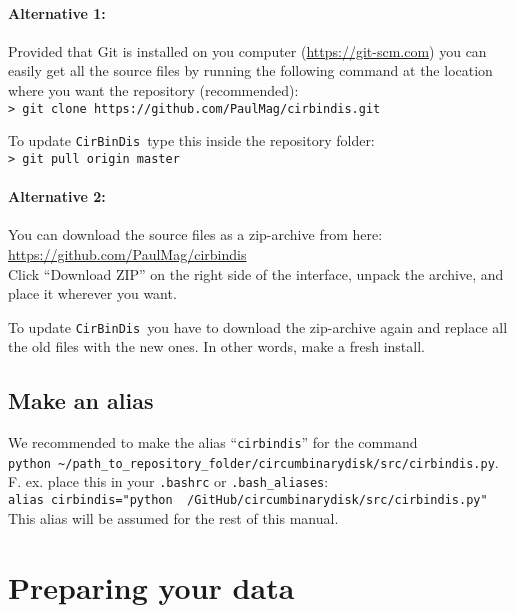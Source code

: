 \documentclass[a4paper, 12pt, english, titlepage]{article}
\newcommand{\sname}{\texttt{CirBinDis }}
\begin{document}
    \paragraph{Alternative 1:}
    Provided that Git is installed on you computer (\url{https://git-scm.com}) you can easily get all the source files by running the following command at the location where you want the repository (recommended): \\
    \texttt{> git clone https://github.com/PaulMag/cirbindis.git}
    
    To update \sname type this inside the repository folder: \\
    \texttt{> git pull origin master}

    \paragraph{Alternative 2:}
    You can download the source files as a zip-archive from here: \\
    \url{https://github.com/PaulMag/cirbindis} \\
    Click ``Download ZIP'' on the right side of the interface,
    unpack the archive, and place it wherever you want.

    To update \sname you have to download the zip-archive again and replace all the old files with the new ones. In other words, make a fresh install.


\subsection{Make an alias}
    We recommended to make the alias ``\texttt{cirbindis}'' for the command \\
    \texttt{python \textasciitilde/path\_to\_repository\_folder/circumbinarydisk/src/cirbindis.py}. \\
    F. ex. place this in your \texttt{.bashrc} or \texttt{.bash\_aliases}: \\
    \texttt{alias cirbindis="python ~/GitHub/circumbinarydisk/src/cirbindis.py"} \\
    This alias will be assumed for the rest of this manual.


\section{Preparing your data}
\end{document}

